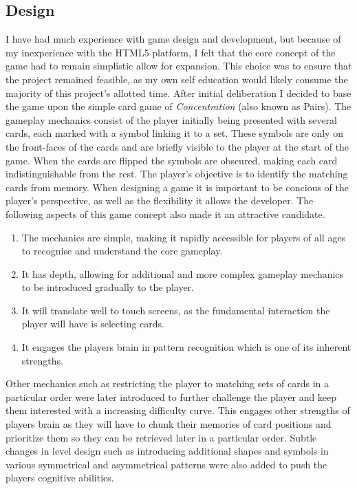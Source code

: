 \documentclass[final]{cmpreport}
\begin{document}
\subsection{Design}
I have had much experience with game design and development, but because of my inexperience with the HTML5 platform, I felt that the core concept of the game had to remain simplistic allow for expansion. This choice was to ensure that the project remained feasible, as my own self education would likely consume the majority of this project's allotted time. After initial deliberation I decided to base the game upon the simple card game of \textit{Concentration\footnotemark} (also known as Pairs). The gameplay mechanics consist of the player initially being presented with several cards, each marked with a symbol linking it to a set. These symbols are only on the front-faces of the cards and are briefly visible to the player at the start of the game. When the cards are flipped the symbols are obscured, making each card indistinguishable from the rest. The player's objective is to identify the matching cards from memory. When designing a game it is important to be concious of the player's perspective, as well as the flexibility it allows the developer. The following aspects of this game concept also made it an attractive candidate.


\begin{enumerate}
  \item The mechanics are simple, making it rapidly accessible for players of all ages to recognise and understand the core gameplay.
  \item It has depth, allowing for additional and more complex gameplay mechanics to be introduced gradually to the player.
  \item It will translate well to touch screens, as the fundamental interaction the player will have is selecting cards.
  \item It engages the players brain in pattern recognition which is one of its inherent strengths.
\end{enumerate}

Other mechanics such as restricting the player to matching sets of cards in a particular order were later introduced to further challenge the player and keep them interested with a increasing difficulty curve. This engages other strengths of players brain as they will have to chunk their memories of card positions and prioritize them so they can be retrieved later in a particular order. Subtle changes in level design such as introducing additional shapes and symbols in various symmetrical and asymmetrical patterns were also added to push the players cognitive abilities.
\end{document}
